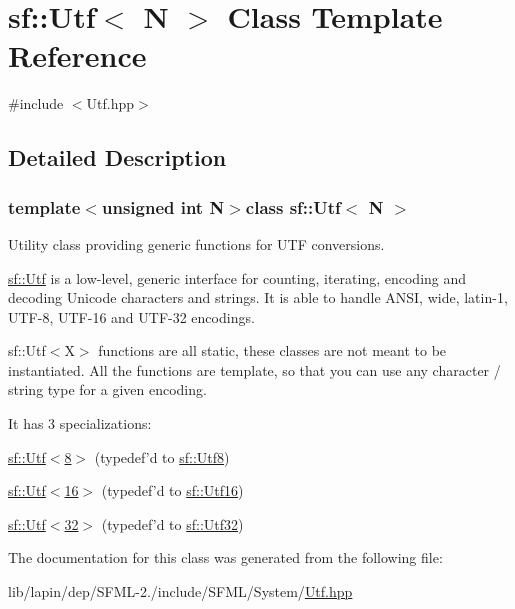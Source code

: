 \hypertarget{classsf_1_1_utf}{\section{sf\-:\-:Utf$<$ N $>$ Class Template Reference}
\label{classsf_1_1_utf}
}


{\ttfamily \#include $<$Utf.\-hpp$>$}



\subsection{Detailed Description}
\subsubsection*{template$<$unsigned int N$>$class sf\-::\-Utf$<$ N $>$}

Utility class providing generic functions for U\-T\-F conversions.

\hyperlink{classsf_1_1_utf}{sf\-::\-Utf} is a low-\/level, generic interface for counting, iterating, encoding and decoding Unicode characters and strings. It is able to handle A\-N\-S\-I, wide, latin-\/1, U\-T\-F-\/8, U\-T\-F-\/16 and U\-T\-F-\/32 encodings.

sf\-::\-Utf$<$\-X$>$ functions are all static, these classes are not meant to be instantiated. All the functions are template, so that you can use any character / string type for a given encoding.

It has 3 specializations\-: \begin{DoxyItemize}
\item \hyperlink{classsf_1_1_utf_3_018_01_4}{sf\-::\-Utf$<$8$>$} (typedef'd to \hyperlink{namespacesf_a8626e71b97fd5e81b6c02cdfe775780f}{sf\-::\-Utf8}) \item \hyperlink{classsf_1_1_utf_3_0116_01_4}{sf\-::\-Utf$<$16$>$} (typedef'd to \hyperlink{namespacesf_a0868ce4b7cda7b545427fe9044e456e2}{sf\-::\-Utf16}) \item \hyperlink{classsf_1_1_utf_3_0132_01_4}{sf\-::\-Utf$<$32$>$} (typedef'd to \hyperlink{namespacesf_ae8ddf58bb1d012fc076ea9d4f8ec2feb}{sf\-::\-Utf32}) \end{DoxyItemize}


The documentation for this class was generated from the following file\-:\begin{DoxyCompactItemize}
\item 
lib/lapin/dep/\-S\-F\-M\-L-\/2./include/\-S\-F\-M\-L/\-System/\hyperlink{lapin_2dep_2_s_f_m_l-2_83_2include_2_s_f_m_l_2_system_2_utf_8hpp}{Utf.\-hpp}\end{DoxyCompactItemize}
